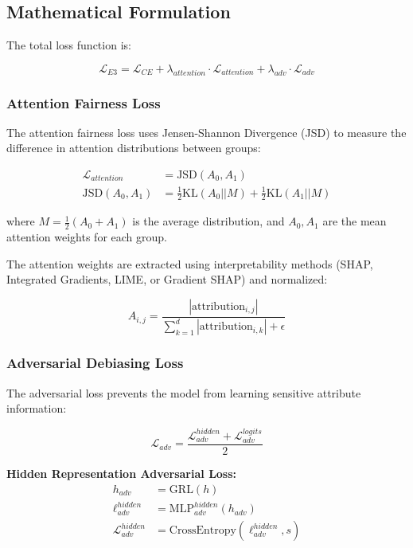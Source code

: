 \documentclass[11pt]{article}
\begin{document}
\subsection{Mathematical Formulation}

The total loss function is:

\begin{equation}
    \mathcal{L}_{E3} = \mathcal{L}_{CE} + \lambda_{attention} \cdot \mathcal{L}_{attention} + \lambda_{adv} \cdot \mathcal{L}_{adv}
\end{equation}

\subsubsection{Attention Fairness Loss}
The attention fairness loss uses Jensen-Shannon Divergence (JSD) to measure the difference in attention distributions between groups:

\begin{align}
    \mathcal{L}_{attention} &= \text{JSD}(A_0, A_1) \\
    \text{JSD}(A_0, A_1) &= \frac{1}{2} \text{KL}(A_0 || M) + \frac{1}{2} \text{KL}(A_1 || M)
\end{align}

where $M = \frac{1}{2}(A_0 + A_1)$ is the average distribution, and $A_0, A_1$ are the mean attention weights for each group.

The attention weights are extracted using interpretability methods (SHAP, Integrated Gradients, LIME, or Gradient SHAP) and normalized:

\begin{equation}
    A_{i,j} = \frac{|\text{attribution}_{i,j}|}{\sum_{k=1}^{d} |\text{attribution}_{i,k}| + \epsilon}
\end{equation}

\subsubsection{Adversarial Debiasing Loss}
The adversarial loss prevents the model from learning sensitive attribute information:

\begin{equation}
    \mathcal{L}_{adv} = \frac{\mathcal{L}_{adv}^{hidden} + \mathcal{L}_{adv}^{logits}}{2}
\end{equation}

\textbf{Hidden Representation Adversarial Loss:}
\begin{align}
    h_{adv} &= \text{GRL}(h) \\
    \ell_{adv}^{hidden} &= \text{MLP}_{adv}^{hidden}(h_{adv}) \\
    \mathcal{L}_{adv}^{hidden} &= \text{CrossEntropy}(\ell_{adv}^{hidden}, s)
\end{align}
\end{document}
